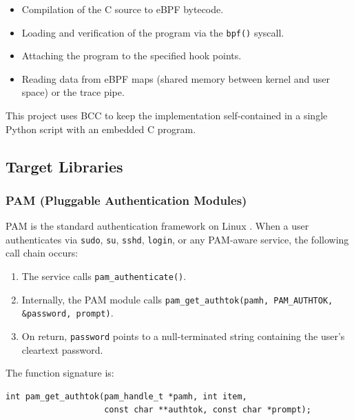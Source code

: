 \documentclass[11pt,a4paper]{article}
\begin{document}
\begin{itemize}
    \item Compilation of the C source to eBPF bytecode.
    \item Loading and verification of the program via the \texttt{bpf()} syscall.
    \item Attaching the program to the specified hook points.
    \item Reading data from eBPF maps (shared memory between kernel and
          user space) or the trace pipe.
\end{itemize}

This project uses BCC to keep the implementation self-contained in a single
Python script with an embedded C program.

\subsection{Target Libraries}
\label{subsec:targets}

\subsubsection{PAM (Pluggable Authentication Modules)}

PAM is the standard authentication framework on Linux \cite{pam_docs}. When a
user authenticates via \texttt{sudo}, \texttt{su}, \texttt{sshd}, \texttt{login},
or any PAM-aware service, the following call chain occurs:

\begin{enumerate}
    \item The service calls \texttt{pam\_authenticate()}.
    \item Internally, the PAM module calls
          \texttt{pam\_get\_authtok(pamh, PAM\_AUTHTOK, \&password, prompt)}.
    \item On return, \texttt{password} points to a null-terminated string
          containing the user's cleartext password.
\end{enumerate}

The function signature is:

\begin{lstlisting}[style=cstyle, caption={pam\_get\_authtok signature}, label={lst:pam_sig}]
int pam_get_authtok(pam_handle_t *pamh, int item,
                    const char **authtok, const char *prompt);
\end{lstlisting}
\end{document}
